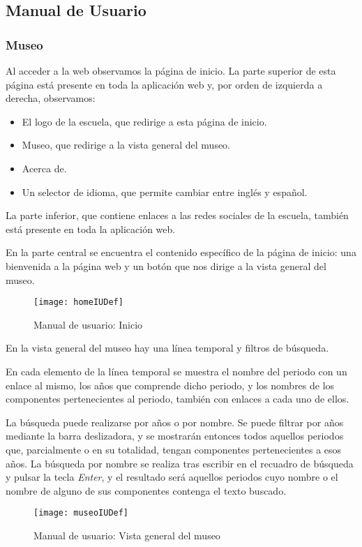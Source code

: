 \subsection{Manual de Usuario} 
\subsubsection{Museo}
Al acceder a la web observamos la página de inicio. La parte superior de esta página está presente en toda la aplicación web y, por orden de izquierda a derecha, observamos:
\begin{itemize}
	\item El logo de la escuela, que redirige a esta página de inicio.
	\item Museo, que redirige a la vista general del museo.
	\item Acerca de.
	\item Un selector de idioma, que permite cambiar entre inglés y español.
\end{itemize}
La parte inferior, que contiene enlaces a las redes sociales de la escuela, también está presente en toda la aplicación web.\par
En la parte central se encuentra el contenido específico de la página de inicio: una bienvenida a la página web y un botón que nos dirige a la vista general del museo.
\begin{figure}[H]
\centering
\centerline{\texttt{[image: homeIUDef]}}
\caption{Manual de usuario: Inicio}
\end{figure}
En la vista general del museo hay una línea temporal y filtros de búsqueda.\par
En cada elemento de la línea temporal se muestra el nombre del periodo con un enlace al mismo, los años que comprende dicho periodo, y los nombres de los componentes pertenecientes al periodo, también con enlaces a cada uno de ellos.\par
La búsqueda puede realizarse por años o por nombre. Se puede filtrar por años mediante la barra deslizadora, y se mostrarán entonces todos aquellos periodos que, parcialmente o en su totalidad, tengan componentes pertenecientes a esos años. La búsqueda por nombre se realiza tras escribir en el recuadro de búsqueda y pulsar la tecla \textit{Enter}, y el resultado será aquellos periodos cuyo nombre o el nombre de alguno de sus componentes contenga el texto buscado.
\begin{figure}[H]
\centering
\centerline{\texttt{[image: museoIUDef]}}
\caption{Manual de usuario: Vista general del museo}
\end{figure}
